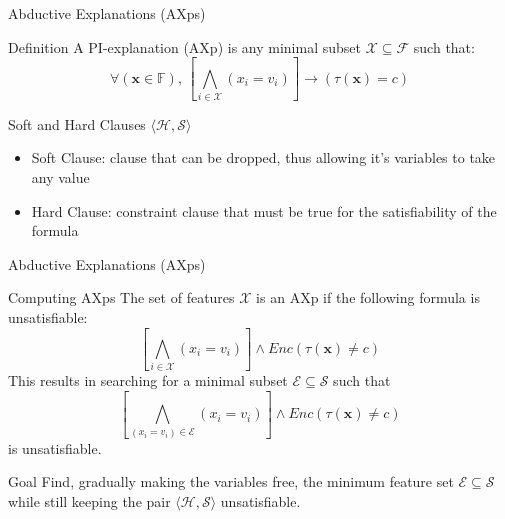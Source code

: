 \begin{frame}{Abductive Explanations (AXps)}
    \begin{block}{Definition}
        A PI-explanation (AXp) is any minimal subset  \(\mathcal{X} \subseteq \mathcal{F} \) such that:
        \begin{equation*}
            \forall (\mathbf{x} \in \mathbb{F}), \, \left[ \bigwedge_{i \in \mathcal{X}} (x_i = v_i) \right] \rightarrow (\tau(\mathbf{x}) = c)
        \end{equation*}
    \end{block}
    \begin{block}{Soft and Hard Clauses \(\langle \mathcal{H},\mathcal{S} \rangle\)}
        \begin{itemize}
            \item Soft Clause: clause that can be dropped, thus allowing it's variables to take any value
            \item Hard Clause: constraint clause that must be true for the satisfiability of the formula
        \end{itemize}
    \end{block}
\end{frame}

\begin{frame}{Abductive Explanations (AXps)}
    \footnotesize
    \begin{block}{Computing AXps}
        The set of features $\mathcal{X}$ is an AXp if the following formula is unsatisfiable:
        \begin{equation*}
            \left[ \bigwedge_{i \in \mathcal{X}} (x_i = v_i) \right] \land Enc(\tau(\mathbf{x}) \neq c)
        \end{equation*}
        This results in searching for a minimal subset $\mathcal{E} \subseteq \mathcal{S}$ such that
        \begin{equation*}
            \left[ \bigwedge_{(x_i = v_i) \in \mathcal{E}} (x_i = v_i) \right] \land Enc(\tau(\mathbf{x}) \neq c)
        \end{equation*} 
        is unsatisfiable.
        \vspace{2pt}
    \end{block}
    \begin{block}{Goal}
        Find, gradually making the variables free, the minimum feature set $\mathcal{E} \subseteq \mathcal{S}$ while still keeping the pair $\langle \mathcal{H},\mathcal{S} \rangle$ unsatisfiable.
    \end{block}
\end{frame}
